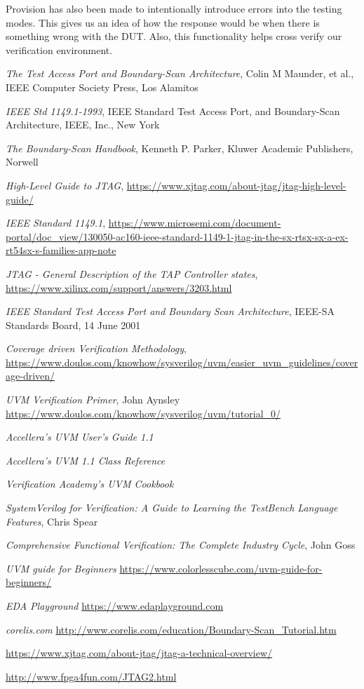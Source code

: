 \documentclass[a4paper,11pt]{article}
\begin{document}
Provision has also been made to intentionally introduce errors into the testing modes. This gives us an idea of how the response would be when there is something wrong with the DUT. Also, this functionality helps cross verify our verification environment.
%
\newpage

\begin{thebibliography}{i}
 {\em The Test Access Port and Boundary-Scan Architecture}, Colin M Maunder, et al., IEEE Computer Society Press, Los Alamitos

 {\em IEEE Std 1149.1-1993}, IEEE Standard Test Access Port, and Boundary-Scan Architecture, IEEE, Inc., New York

 {\em The Boundary-Scan Handbook}, Kenneth P. Parker, Kluwer Academic Publishers, Norwell

 {\em High-Level Guide to JTAG},
\url{https://www.xjtag.com/about-jtag/jtag-high-level-guide/}

 {\em IEEE Standard 1149.1},
\url{https://www.microsemi.com/document-portal/doc_view/130050-ac160-ieee-standard-1149-1-jtag-in-the-sx-rtsx-sx-a-ex-rt54sx-s-families-app-note}

 {\em JTAG - General Description of the TAP Controller states},
\url{https://www.xilinx.com/support/answers/3203.html}

 {\em IEEE Standard Test Access Port and Boundary Scan Architecture}, IEEE-SA Standards Board, 14 June 2001

 {\em Coverage driven Verification Methodology},
\url{https://www.doulos.com/knowhow/sysverilog/uvm/easier_uvm_guidelines/coverage-driven/}

 {\em UVM Verification Primer}, John Aynsley
\url{https://www.doulos.com/knowhow/sysverilog/uvm/tutorial_0/}

 {\em Accellera's UVM User's Guide 1.1}

 {\em Accellera's UVM 1.1 Class Reference}

 {\em Verification Academy's UVM Cookbook}

 {\em SystemVerilog for Verification: A Guide to Learning the TestBench Language Features}, Chris Spear

 {\em Comprehensive Functional Verification: The Complete Industry Cycle}, John Goss

 {\em UVM guide for Beginners}
\url{https://www.colorlesscube.com/uvm-guide-for-beginners/}

 {\em EDA Playground}
\url{https://www.edaplayground.com}

 {\em corelis.com}
\url{http://www.corelis.com/education/Boundary-Scan_Tutorial.htm}

\url{https://www.xjtag.com/about-jtag/jtag-a-technical-overview/}

\url{http://www.fpga4fun.com/JTAG2.html}

\end{thebibliography} 
%
%
% 
 
\end{document}
